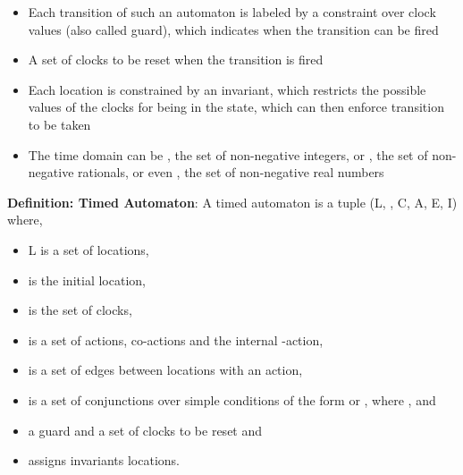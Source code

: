\documentclass[letterpaper]{article}
\begin{document}
\begin{itemize}
	\item Each transition of such an automaton is labeled by a constraint over clock values (also called guard), which indicates when the transition can be fired
	\item A set of clocks to be reset when the transition is fired
	\item Each location is constrained by an invariant, which restricts the possible values of the clocks for being in the state, which can then enforce transition to be taken
	\item The time domain can be , the set of non-negative integers, or , the set of non-negative rationals, or even , the set of non-negative real numbers
\end{itemize}
 
\textbf{Definition: Timed Automaton}: A timed automaton is a tuple (L, , C, A, E, I) where,
\begin{itemize}
	\item L is a set of locations,
	\item  is the initial location,
	\item  is the set of clocks,
	\item  is a set of actions, co-actions and the internal -action,
	\item  is a set of edges between locations with an action,
	\item  is a set of conjunctions over simple conditions of the form  or , where ,  and 
	\item a guard and a set of clocks to be reset and
	\item  assigns invariants locations.
\end{itemize}
\end{document}
